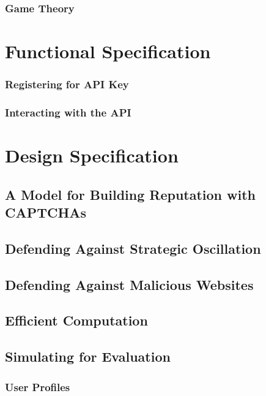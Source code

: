 \documentclass[journal, 12pt, onecolumn, draftclsnofoot]{IEEEtran}
\begin{document}
\subsubsection{Game Theory}

\section{Functional Specification}
\label{Functional Specification}

\subsubsection{Registering for API Key}

\subsubsection{Interacting with the API}

\section{Design Specification}
\label{Design Specification}

\subsection{A Model for Building Reputation with CAPTCHAs}

\subsection{Defending Against Strategic Oscillation}

\subsection{Defending Against Malicious Websites}

\subsection{Efficient Computation}

\subsection{Simulating for Evaluation}

\subsubsection{User Profiles}
\end{document}
